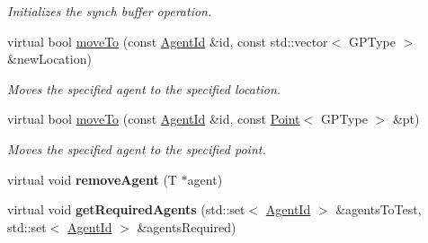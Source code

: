 \begin{DoxyCompactItemize}
\begin{DoxyCompactList}\small\item\em Initializes the synch buffer operation. \end{DoxyCompactList}\item 
virtual bool \hyperlink{classrepast_1_1_shared_base_grid_a480fc6f517d1bb098c7ee47450fba522}{move\-To} (const \hyperlink{classrepast_1_1_agent_id}{Agent\-Id} \&id, const std\-::vector$<$ G\-P\-Type $>$ \&new\-Location)
\begin{DoxyCompactList}\small\item\em Moves the specified agent to the specified location. \end{DoxyCompactList}\item 
virtual bool \hyperlink{classrepast_1_1_shared_base_grid_ab4d74c36e126cffa5638aeaab6c0df85}{move\-To} (const \hyperlink{classrepast_1_1_agent_id}{Agent\-Id} \&id, const \hyperlink{classrepast_1_1_point}{Point}$<$ G\-P\-Type $>$ \&pt)
\begin{DoxyCompactList}\small\item\em Moves the specified agent to the specified point. \end{DoxyCompactList}\item 
\hypertarget{classrepast_1_1_shared_base_grid_ace1d00758e418a574263997e7db2f26a}{virtual void {\bfseries remove\-Agent} (T $\ast$agent)}\label{classrepast_1_1_shared_base_grid_ace1d00758e418a574263997e7db2f26a}

\item 
\hypertarget{classrepast_1_1_shared_base_grid_a810df20298f76741ab58907fb5e20749}{virtual void {\bfseries get\-Required\-Agents} (std\-::set$<$ \hyperlink{classrepast_1_1_agent_id}{Agent\-Id} $>$ \&agents\-To\-Test, std\-::set$<$ \hyperlink{classrepast_1_1_agent_id}{Agent\-Id} $>$ \&agents\-Required)}\label{classrepast_1_1_shared_base_grid_a810df20298f76741ab58907fb5e20749}


\end{DoxyCompactItemize}
